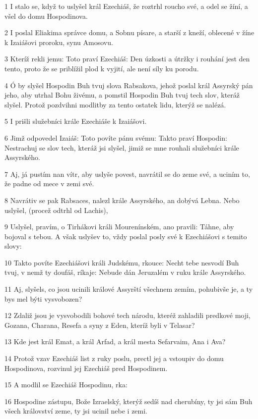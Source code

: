 \par 1 I stalo se, když to uslyšel král Ezechiáš, že roztrhl roucho své, a odel se žíní, a všel do domu Hospodinova.
\par 2 I poslal Eliakima správce domu, a Sobnu písare, a starší z kneží, oblecené v žíne k Izaiášovi proroku, synu Amosovu.
\par 3 Kteríž rekli jemu: Toto praví Ezechiáš: Den úzkosti a útržky i rouhání jest den tento, proto že se priblížil plod k vyjití, ale není síly ku porodu.
\par 4 Ó by slyšel Hospodin Buh tvuj slova Rabsakova, jehož poslal král Assyrský pán jeho, aby utrhal Bohu živému, a pomstil Hospodin Buh tvuj tech slov, kteráž slyšel. Protož pozdvihni modlitby za tento ostatek lidu, kterýž se nalézá.
\par 5 I prišli služebníci krále Ezechiáše k Izaiášovi.
\par 6 Jimž odpovedel Izaiáš: Toto povíte pánu svému: Takto praví Hospodin: Nestrachuj se slov tech, kteráž jsi slyšel, jimiž se mne rouhali služebníci krále Assyrského.
\par 7 Aj, já pustím nan vítr, aby uslyše povest, navrátil se do zeme své, a uciním to, že padne od mece v zemi své.
\par 8 Navrátiv se pak Rabsaces, nalezl krále Assyrského, an dobývá Lebna. Nebo uslyšel, (procež odtrhl od Lachis),
\par 9 Uslyšel, pravím, o Tirhákovi králi Mourenínském, ano pravili: Táhne, aby bojoval s tebou. A však uslyšev to, vždy poslal posly své k Ezechiášovi s temito slovy:
\par 10 Takto povíte Ezechiášovi králi Judskému, rkouce: Necht tebe nesvodí Buh tvuj, v nemž ty doufáš, ríkaje: Nebude dán Jeruzalém v ruku krále Assyrského.
\par 11 Aj, slyšels, co jsou ucinili králové Assyrští všechnem zemím, pohubivše je, a ty bys mel býti vysvobozen?
\par 12 Zdaliž jsou je vysvobodili bohové tech národu, kteréž zahladili predkové moji, Gozana, Charana, Resefa a syny z Eden, kteríž byli v Telasar?
\par 13 Kde jest král Emat, a král Arfad, a král mesta Sefarvaim, Ana i Ava?
\par 14 Protož vzav Ezechiáš list z ruky poslu, prectl jej a vstoupiv do domu Hospodinova, rozvinul jej Ezechiáš pred Hospodinem.
\par 15 A modlil se Ezechiáš Hospodinu, rka:
\par 16 Hospodine zástupu, Bože Izraelský, kterýž sedíš nad cherubíny, ty jsi sám Buh všech království zeme, ty jsi ucinil nebe i zemi.
